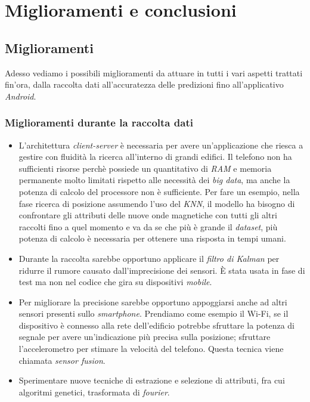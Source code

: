 \chapter{Miglioramenti e conclusioni}
\section{Miglioramenti}
Adesso vediamo i possibili miglioramenti da attuare in tutti i vari aspetti trattati fin'ora, dalla raccolta dati all'accuratezza delle predizioni fino all'applicativo \textit{Android}.
\subsection{Miglioramenti durante la raccolta dati}
\begin{itemize}
	\item L'architettura \textit{client-server} \`e necessaria per avere un'applicazione che riesca a gestire con fluidit\`a la ricerca all'interno di grandi edifici. Il telefono non ha sufficienti risorse perch\`e possiede un quantitativo di \textit{RAM} e memoria permanente molto limitati rispetto alle necessit\`a dei \textit{big data}, ma anche la potenza di calcolo del processore non \`e sufficiente. Per fare un esempio, nella fase ricerca di posizione assumendo l'uso del \textit{KNN}, il modello ha bisogno di confrontare gli attributi delle nuove onde magnetiche con tutti gli altri raccolti fino a quel momento e va da se che pi\`u  \`e grande il \textit{dataset}, pi\`u  potenza di calcolo \`e necessaria per ottenere una risposta in tempi umani.
	\item Durante la raccolta sarebbe opportuno applicare il \textit{filtro di Kalman} per ridurre il rumore causato dall'imprecisione dei sensori. \`E stata usata in fase di test ma non nel codice che gira su dispositivi \textit{mobile}.
	\item Per migliorare la precisione sarebbe opportuno appoggiarsi anche ad altri sensori presenti sullo \textit{smartphone}. Prendiamo come esempio il Wi-Fi, se il dispositivo \`e connesso alla rete dell'edificio potrebbe sfruttare la potenza di segnale per avere un'indicazione pi\`u precisa sulla posizione; sfruttare l'accelerometro per stimare la velocit\`a del telefono. Questa tecnica viene chiamata \textit{sensor fusion}\cite{shala2011indoor}.
	\item Sperimentare nuove tecniche di estrazione e selezione di attributi, fra cui algoritmi genetici, trasformata di \textit{fourier}.
\end{itemize}
